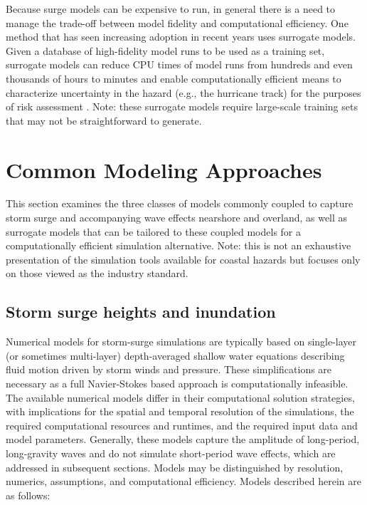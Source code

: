 Because surge models can be expensive to run, in general there is a need to manage the trade-off between model fidelity and computational efficiency. One method that has seen increasing adoption in recent years uses surrogate models. Given a database of high-fidelity model runs to be used as a training set, surrogate models can reduce CPU times of model runs from hundreds and even thousands of hours to minutes and enable computationally efficient means to characterize uncertainty in the hazard (e.g., the hurricane track) for the purposes of risk assessment \citep{kijewski-correa2014cybereye}. Note: these surrogate models require large-scale training sets that may not be straightforward to generate. 

\section{Common Modeling Approaches}
\label{sec:storm_surge_methods}

This section examines the three classes of models commonly coupled to capture storm surge and accompanying wave effects nearshore and overland, as well as surrogate models that can be tailored to these coupled models for a computationally efficient simulation alternative. Note: this is not an exhaustive presentation of the simulation tools available for coastal hazards but focuses only on those viewed as the industry standard. 

\subsection{Storm surge heights and inundation}

Numerical models for storm-surge simulations are typically based on single-layer (or sometimes multi-layer) depth-averaged shallow water equations describing fluid motion driven by storm winds and pressure. These simplifications are necessary as a full Navier-Stokes based approach is computationally infeasible. The available numerical models differ in their computational solution strategies, with implications for the spatial and temporal resolution of the simulations, the required computational resources and runtimes, and the required input data and model parameters. Generally, these models capture the amplitude of long-period, long-gravity waves and do not simulate short-period wave effects, which are addressed in subsequent sections. Models may be distinguished by resolution, numerics, assumptions, and computational efficiency. Models described herein are as follows:

